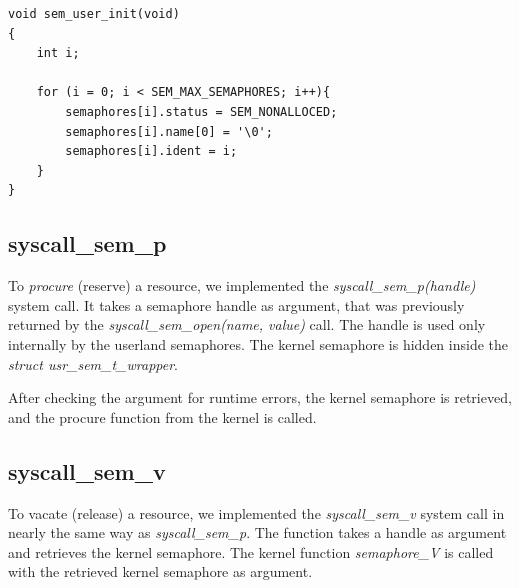 \documentclass[11pt]{article}
\begin{document}
    \begin{lstlisting}[style=customc]
void sem_user_init(void)
{
    int i;

    for (i = 0; i < SEM_MAX_SEMAPHORES; i++){
        semaphores[i].status = SEM_NONALLOCED;
        semaphores[i].name[0] = '\0';
        semaphores[i].ident = i;
    }
}
    \end{lstlisting}

\subsection{syscall\_sem\_p}
To \emph{procure} (reserve) a resource, we implemented the \emph{syscall\_sem\_p(handle)} system call. It takes a semaphore handle as argument, that was previously returned by the \emph{syscall\_sem\_open(name, value)} call. The handle is used only internally by the userland semaphores. The kernel semaphore is hidden inside the \emph{struct usr\_sem\_t\_wrapper}.

After checking the argument for runtime errors, the kernel semaphore is retrieved, and the procure function from the kernel is called.








\subsection{syscall\_sem\_v}
To vacate (release) a resource, we implemented the \emph{syscall\_sem\_v} system call in nearly the same way as \emph{syscall\_sem\_p}. The function takes a handle as argument and retrieves the kernel semaphore. The kernel function \emph{semaphore\_V} is called with the retrieved kernel semaphore as argument.

\end{document}
